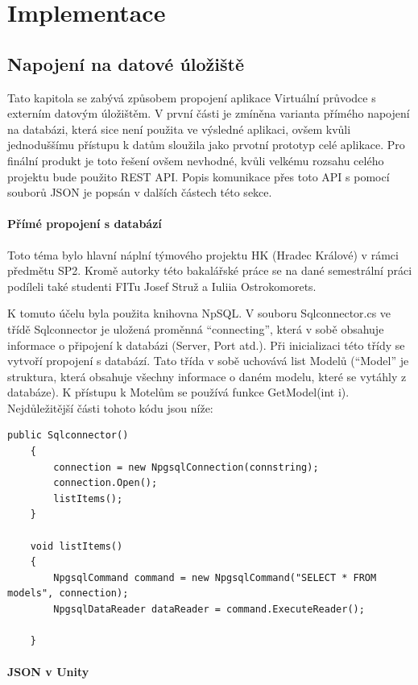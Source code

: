 \documentclass[thesis=B,czech]{FITthesis}[2012/06/26]
\begin{document}
\chapter{Implementace}

	\section{Napojení na datové úložiště}
		    Tato kapitola se zabývá způsobem propojení aplikace Virtuální průvodce s externím datovým úložištěm. V první části je zmíněna varianta přímého napojení na databázi, která sice není použita ve výsledné aplikaci, ovšem kvůli jednoduššímu přístupu k datům sloužila jako prvotní prototyp celé aplikace. Pro finální produkt je toto řešení ovšem nevhodné, kvůli velkému rozsahu celého projektu bude použito REST API. Popis komunikace přes toto API s pomocí souborů JSON je popsán v dalších částech této sekce.
    

\subsubsection{Přímé propojení s databází}
 Toto téma bylo hlavní náplní týmového projektu HK (Hradec Králové) v rámci předmětu SP2. Kromě autorky této bakalářské práce se na dané semestrální práci podíleli také studenti FITu Josef Struž a Iuliia Ostrokomorets. 
   
    K tomuto účelu byla použita knihovna NpSQL. V souboru Sqlconnector.cs ve třídě Sqlconnector je uložená proměnná “connecting”, která v sobě obsahuje informace o připojení k databázi (Server, Port atd.). Při inicializaci této třídy se vytvoří propojení s databází. Tato třída v sobě uchovává list Modelů (“Model” je struktura, která obsahuje všechny informace o daném modelu, které se vytáhly z databáze). K přístupu k Motelům se používá funkce GetModel(int i). Nejdůležitější části tohoto kódu jsou níže:
    \begin{lstlisting}[frame=single]
    public Sqlconnector()
    {
        connection = new NpgsqlConnection(connstring);
        connection.Open();
        listItems();              
    }

    void listItems()
    {
        NpgsqlCommand command = new NpgsqlCommand("SELECT * FROM models", connection);
        NpgsqlDataReader dataReader = command.ExecuteReader();
        
    }
	\end{lstlisting}
    
    \subsubsection{JSON v Unity}
	
\end{document}
